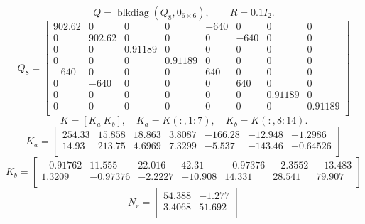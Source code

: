 \[Q=\operatorname{blkdiag}(Q_8,0_{6\times6}),\qquad R=0.1 I_2.\]
{\small
\[
Q_8=\begin{bmatrix}
902.62 & 0 & 0 & 0 & -640 & 0 & 0 & 0 \\
0 & 902.62 & 0 & 0 & 0 & -640 & 0 & 0 \\
0 & 0 & 0.91189 & 0 & 0 & 0 & 0 & 0 \\
0 & 0 & 0 & 0.91189 & 0 & 0 & 0 & 0 \\
-640 & 0 & 0 & 0 & 640 & 0 & 0 & 0 \\
0 & -640 & 0 & 0 & 0 & 640 & 0 & 0 \\
0 & 0 & 0 & 0 & 0 & 0 & 0.91189 & 0 \\
0 & 0 & 0 & 0 & 0 & 0 & 0 & 0.91189 \\
\end{bmatrix}
\]
\[K=[K_a\ K_b],\quad K_a=K(:,1{:}7),\quad K_b=K(:,8{:}14).\]
\[
K_a=\begin{bmatrix}
254.33 & 15.858 & 18.863 & 3.8087 & -166.28 & -12.948 & -1.2986 \\
14.93 & 213.75 & 4.6969 & 7.3299 & -5.537 & -143.46 & -0.64526 \\
\end{bmatrix}
\]
\[
K_b=\begin{bmatrix}
-0.91762 & 11.555 & 22.016 & 42.31 & -0.97376 & -2.3552 & -13.483 \\
1.3209 & -0.97376 & -2.2227 & -10.908 & 14.331 & 28.541 & 79.907 \\
\end{bmatrix}
\]
\[
N_r=\begin{bmatrix}
54.388 & -1.277 \\
3.4068 & 51.692 \\
\end{bmatrix}
\]
}
